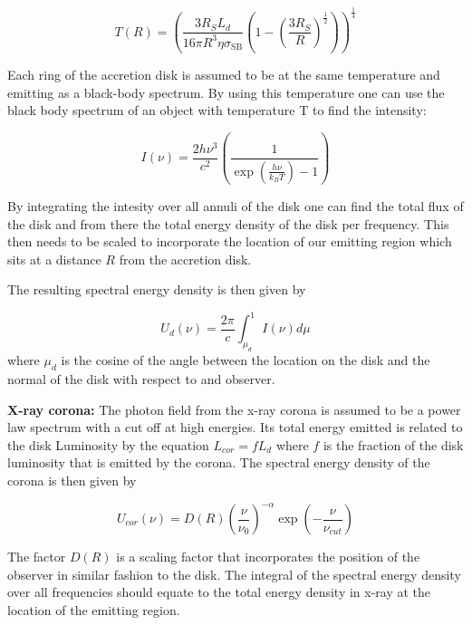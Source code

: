 \begin{equation}
    T(R) = \left(\frac{3 R_{S} L_{d}}{16 \pi R^3 \eta \sigma_{\mathrm{SB}}} \left(1-\left(\frac{3 R_{S}}{R}\right)^{\frac{1}{2}}\right) \right)^{\frac{1}{4}}
\end{equation}

Each ring of the accretion disk is assumed to be at the same temperature and emitting as a black-body spectrum. By using this temperature one can use the black body spectrum of an object with temperature T to find the intensity:

\begin{equation}
    \label{eq:BB}
    I(\nu) = \frac{2 h \nu^3}{c^2} \left(\frac{1}{\exp\left(\frac{h \nu}{k_B T}\right) - 1}\right)
\end{equation}

By integrating the intesity over all annuli of the disk one can find the total flux of the disk and from there the total energy density of the disk per frequency.
This then needs to be scaled to incorporate the location of our emitting region which sits at a distance $R$ from the accretion disk. 

The resulting spectral energy density is then given by

\begin{equation}
    U_d(\nu) = \frac{2\pi}{c} \int_{\mu_d}^1 I(\nu) d\mu
\end{equation}
where $\mu_d$ is the cosine of the angle between the location on the disk and the normal of the disk with respect to and observer.



\textbf{X-ray corona:} The photon field from the x-ray corona is assumed to be a power law spectrum with a cut off at high energies. Its total energy emitted is related to the disk Luminosity 
by the equation $L_{cor} = f L_d$ where $f$ is the fraction of the disk luminosity that is emitted by the corona. The spectral energy density of the corona is then given by 

\begin{equation}
    U_{cor}(\nu) = D(R)\left(\frac{\nu}{\nu_0}\right)^{-\alpha} \exp\left(-\frac{\nu}{\nu_{cut}}\right)
\end{equation}

The factor $D(R)$ is a scaling factor that incorporates the position of the observer in similar fashion to the disk. The integral of the spectral energy density over all frequencies should equate to the total energy density in x-ray at the location of the emitting region.

